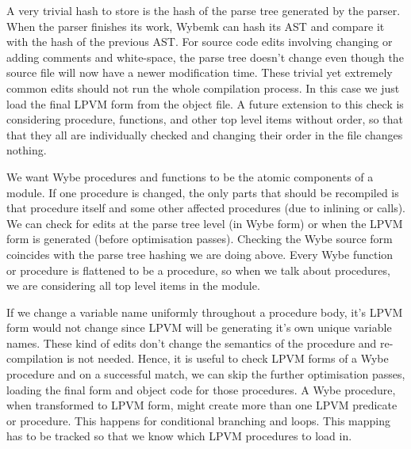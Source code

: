 A very trivial hash to store is the hash of the parse tree generated by the
parser. When the parser finishes its work, Wybemk can hash its AST and compare
it with the hash of the previous AST. For source code edits involving changing
or adding comments and white-space, the parse tree doesn't change even though
the source file will now have a newer modification time. These trivial yet
extremely common edits should not run the whole compilation process. In this
case we just load the final LPVM form from the object file. A future extension
to this check is considering procedure, functions, and other top level items
without order, so that that they all are individually checked and changing
their order in the file changes nothing.


We want Wybe procedures and functions to be the atomic components of a
module. If one procedure is changed, the only parts that should be recompiled
is that procedure itself and some other affected procedures (due to inlining or
calls). We can check for edits at the parse tree level (in Wybe form) or when
the LPVM form is generated (before optimisation passes). Checking the Wybe
source form coincides with the parse tree hashing we are doing above. Every
Wybe function or procedure is flattened to be a procedure, so when we talk
about procedures, we are considering all top level items in the module. 

If we change a variable name uniformly throughout a procedure body, it's LPVM
form would not change since LPVM will be generating it's own unique variable
names. These kind of edits don't change the semantics of the procedure and
re-compilation is not needed. Hence, it is useful to check LPVM forms of a Wybe
procedure and on a successful match, we can skip the further optimisation
passes, loading the final form and object code for those procedures. A Wybe
procedure, when transformed to LPVM form, might create more than one LPVM
predicate or procedure. This happens for conditional branching and loops. This
mapping has to be tracked so that we know which LPVM procedures to load in.


